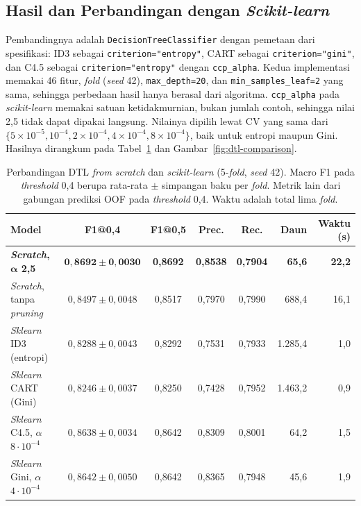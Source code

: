\subsection{Hasil dan Perbandingan dengan \textit{Scikit-learn}}
\label{subsec:dtl-hasil}

Pembandingnya adalah \texttt{DecisionTreeClassifier} \cite{sklearn-dtc} dengan pemetaan dari
spesifikasi: ID3 sebagai \texttt{criterion="entropy"}, CART sebagai \texttt{criterion="gini"}, dan
C4.5 sebagai \texttt{criterion="entropy"} dengan \texttt{ccp\_alpha}. Kedua implementasi memakai
46 fitur, \textit{fold} (\textit{seed} 42), \texttt{max\_depth=20}, dan \texttt{min\_samples\_leaf=2}
yang sama, sehingga perbedaan hasil hanya berasal dari algoritma. \texttt{ccp\_alpha} pada
\textit{scikit-learn} memakai satuan ketidakmurnian, bukan jumlah contoh, sehingga nilai 2,5 tidak
dapat dipakai langsung. Nilainya dipilih lewat CV yang sama dari $\{5 \times 10^{-5}, 10^{-4},
2 \times 10^{-4}, 4 \times 10^{-4}, 8 \times 10^{-4}\}$, baik untuk entropi maupun Gini. Hasilnya
dirangkum pada Tabel~\ref{tab:dtl-hasil} dan Gambar~\ref{fig:dtl-comparison}.

\begin{table}[H]
	\centering
	\caption{Perbandingan DTL \textit{from scratch} dan \textit{scikit-learn} (5-\textit{fold}, \textit{seed} 42). Macro F1 pada \textit{threshold} 0,4 berupa rata-rata $\pm$ simpangan baku per \textit{fold}. Metrik lain dari gabungan prediksi OOF pada \textit{threshold} 0,4. Waktu adalah total lima \textit{fold}.}
	\label{tab:dtl-hasil}
	\footnotesize
	\setlength{\tabcolsep}{3.5pt}
	\begin{tabularx}{\textwidth}{>{\raggedright\arraybackslash}X c c c c r r}
		\toprule
		\textbf{Model} & \textbf{F1@0,4} & \textbf{F1@0,5} & \textbf{Prec.} & \textbf{Rec.} & \textbf{Daun} & \textbf{Waktu (s)} \\
		\midrule
		\textbf{\textit{Scratch}, $\boldsymbol{\alpha}$ 2,5} & $\mathbf{0{,}8692 \pm 0{,}0030}$ & \textbf{0,8692} & \textbf{0,8538} & \textbf{0,7904} & \textbf{65,6} & \textbf{22,2} \\
		\textit{Scratch}, tanpa \textit{pruning} & $0{,}8497 \pm 0{,}0048$ & 0,8517 & 0,7970 & 0,7990 & 688,4 & 16,1 \\
		\textit{Sklearn} ID3 (entropi) & $0{,}8288 \pm 0{,}0043$ & 0,8292 & 0,7531 & 0,7933 & 1.285,4 & 1,0 \\
		\textit{Sklearn} CART (Gini) & $0{,}8246 \pm 0{,}0037$ & 0,8250 & 0,7428 & 0,7952 & 1.463,2 & 0,9 \\
		\textit{Sklearn} C4.5, $\alpha$ $8 \cdot 10^{-4}$ & $0{,}8638 \pm 0{,}0034$ & 0,8642 & 0,8309 & 0,8001 & 64,2 & 1,5 \\
		\textit{Sklearn} Gini, $\alpha$ $4 \cdot 10^{-4}$ & $0{,}8642 \pm 0{,}0050$ & 0,8642 & 0,8365 & 0,7948 & 45,6 & 1,9 \\
		\bottomrule
	\end{tabularx}
\end{table}

